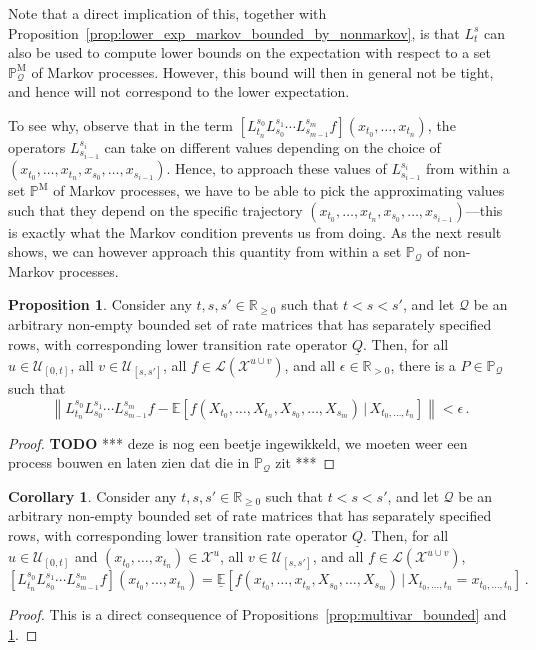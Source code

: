 \documentclass[10pt]{paper}
\theoremstyle{definition}
\newtheorem{proposition}[theorem]{Proposition}
\newtheorem{corollary}[theorem]{Corollary}
\newcommand{\reals}{\mathbb{R}}
\newcommand{\realspos}{\reals_{>0}}
\newcommand{\realsnonneg}{\reals_{\geq 0}}
\newcommand{\states}{\mathcal{X}}
\newcommand{\processes}{\mathbb{P}}
\newcommand{\mprocesses}{\processes^{\mathrm{M}}}
\newcommand{\gambles}{\mathcal{L}}
\newcommand{\rateset}{\mathcal{Q}}
\newcommand{\lrate}{\underline{Q}}
\newcommand{\norm}[1]{\left\lVert #1 \right\rVert}
\begin{document}
Note that a direct implication of this, together with Proposition~\ref{prop:lower_exp_markov_bounded_by_nonmarkov}, is that $L_t^s$ can also be used to compute lower bounds on the expectation with respect to a set $\mprocesses_\rateset$ of Markov processes. However, this bound will then in general not be tight, and hence will not correspond to the lower expectation.

To see why, observe that in the term $[L_{t_n}^{s_0}L_{s_0}^{s_1}\cdots L_{s_{m-1}}^{s_m}f](x_{t_0},\ldots,x_{t_n})$, the operators $L_{s_{i-1}}^{s_i}$ can take on different values depending on the choice of $(x_{t_0},\ldots,x_{t_n},x_{s_0},\ldots,x_{s_{i-1}})$. Hence, to approach these values of $L_{s_{i-1}}^{s_i}$ from within a set $\mprocesses$ of Markov processes, we have to be able to pick the approximating values such that they depend on the specific trajectory $(x_{t_0},\ldots,x_{t_n},x_{s_0},\ldots,x_{s_{i-1}})$---this is exactly what the Markov condition prevents us from doing. As the next result shows, we can however approach this quantity from within a set $\processes_\rateset$ of non-Markov processes.

\begin{proposition}\label{prop:multivar_bound_tight}
Consider any $t,s,s'\in\realsnonneg$ such that $t<s<s'$, and let $\rateset$ be an arbitrary non-empty bounded set of rate matrices that has separately specified rows, with corresponding lower transition rate operator $\lrate$. Then, for all $u\in\mathcal{U}_{[0,t]}$, all $v\in\mathcal{U}_{[s,s']}$, all $f\in\gambles(\states^{u\cup v})$, and all $\epsilon\in\realspos$, there is a $P\in\processes_\rateset$ such that
\begin{equation*}
\norm{L_{t_n}^{s_0}L_{s_0}^{s_1}\cdots L_{s_{m-1}}^{s_m}f - \mathbb{E}[f(X_{t_0},\ldots,X_{t_n},X_{s_0},\ldots,X_{s_m})\,\vert\,X_{t_0,\ldots,t_n}]} < \epsilon\,.
\end{equation*}
\end{proposition}
\begin{proof}
{\bf TODO} *** deze is nog een beetje ingewikkeld, we moeten weer een process bouwen en laten zien dat die in $\processes_\rateset$ zit ***
\end{proof}
\begin{corollary}
Consider any $t,s,s'\in\realsnonneg$ such that $t<s<s'$, and let $\rateset$ be an arbitrary non-empty bounded set of rate matrices that has separately specified rows, with corresponding lower transition rate operator $\lrate$. Then, for all $u\in\mathcal{U}_{[0,t]}$ and $(x_{t_0},\ldots,x_{t_n})\in\states^u$, all $v\in\mathcal{U}_{[s,s']}$, and all $f\in\gambles(\states^{u\cup v})$,
\begin{equation*}
\left[L_{t_n}^{s_0}L_{s_0}^{s_1}\cdots L_{s_{m-1}}^{s_m}f\right](x_{t_0},\ldots,x_{t_n}) = \underline{\mathbb{E}}[f(x_{t_0},\ldots,x_{t_n},X_{s_0},\ldots,X_{s_m})\,\vert\,X_{t_0,\ldots,t_n}=x_{t_0,\ldots,t_n}]\,.
\end{equation*}
\end{corollary}
\begin{proof}
This is a direct consequence of Propositions~\ref{prop:multivar_bounded} and \ref{prop:multivar_bound_tight}.
\end{proof}
\end{document}
